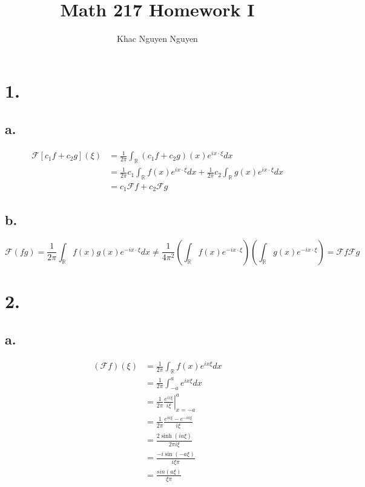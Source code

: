 \documentclass[11pt]{article}
\title{\textbf{Math 217 Homework I}}
\author{Khac Nguyen Nguyen}
\date{}
\theoremstyle{mystyle}
\theoremstyle{definition}
\begin{document}
\section*{1.}
\subsection*{a.}
\begin{align*}
  \mathcal{F}[c_1 f + c_2g](\xi) 
  &= \displaystyle\frac{1}{2\pi} \int_\mathbb{R} (c_1f + c_2g)(x) e^{ix \cdot \xi} dx \\
  &= \displaystyle\frac{1}{2\pi}c_1 \int_\mathbb{R} f(x) e^{ix \cdot \xi} dx + \displaystyle\frac{1}{2\pi}c_2 \int_\mathbb{R} g(x) e^{ix \cdot \xi} dx \\
  &= c_1\mathcal F f +c_2 \mathcal F g
\end{align*}
\subsection*{b.}
\[
  \mathcal F (fg) = \displaystyle\frac{1}{2\pi} \int_\mathbb{R} f(x)g(x) e^{-ix \cdot \xi} dx \ne \displaystyle\frac{1}{4\pi^2}\left(\int_\mathbb{R} f(x) e^{-ix \cdot \xi} \right)\left(\int_\mathbb{R} g(x) e^{-ix \cdot \xi} \right) = \mathcal F f \mathcal F g
\]
\newpage
\section*{2.}
\subsection*{a.}
\begin{align*}
  (\mathcal F f)(\xi) 
  &= \displaystyle\frac{1}{2\pi} \int_\mathbb{R} f(x) e^{ix \xi} dx \\
  &= \displaystyle\frac{1}{2\pi} \int_{-a}^a e^{ix \xi} dx \\
  &= \displaystyle\frac{1}{2\pi} \left.\displaystyle\frac{e^{ix \xi}}{i\xi} \right|_{x =-a}^a \\
  &= \displaystyle\frac{1}{2\pi} \displaystyle\frac{e^{ia \xi} - e^{-ia\xi}}{i\xi} \\
  &= \displaystyle\frac{2\sinh(ia\xi)}{2\pi i\xi} \\
  &= \displaystyle\frac{-i\sin(-a\xi)}{i\xi \pi} \\ 
  &= \displaystyle\frac{sin(a\xi)}{\xi \pi}
\end{align*}
\end{document}
